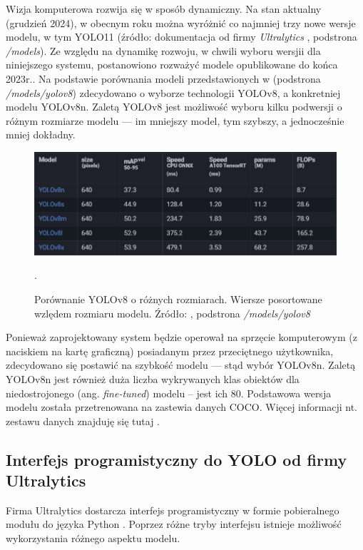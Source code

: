 Wizja komputerowa rozwija się w sposób dynamiczny. Na stan aktualny (grudzień 2024), w obecnym roku można wyróżnić co najmniej trzy nowe wersje modelu, w tym YOLO11 \cite{yolo11_ultralytics} (źródło: dokumentacja od firmy \emph{Ultralytics} \cite{yolo_docs}, podstrona \emph{/models}).
Ze względu na dynamikę rozwoju, w chwili wyboru wersjii dla niniejszego systemu, postanowiono rozważyć modele opublikowane do końca 2023r.. Na podstawie porównania modeli przedstawionych w \cite{yolo_docs} (podstrona \emph{/models/yolov8}) zdecydowano o wyborze technologii YOLOv8, a konkretniej modelu YOLOv8n. Zaletą YOLOv8 jest możliwość wyboru kilku podwersji o różnym rozmiarze modelu --- im mniejszy model, tym szybszy, a jednocześnie mniej dokładny.

\begin{figure}[H]
    \centering
    \includegraphics[width=\linewidth]{r_technologie/AI_assets/yolo8_sizes.png}
    \caption{Porównanie YOLOv8 o różnych rozmiarach. Wiersze posortowane wzlędem rozmiaru modelu. Źródło: \cite{yolo_docs}, podstrona \emph{/models/yolov8}}.
    \label{fig:yolo8-sizes}
\end{figure}

Ponieważ zaprojektowany system będzie operował na sprzęcie komputerowym (z naciskiem na kartę graficzną) posiadanym przez przeciętnego użytkownika, zdecydowano się postawić na szybkość modelu --- stąd wybór YOLOv8n. 
Zaletą YOLOv8n jest również duża liczba wykrywanych klas obiektów dla niedostrojonego (ang. \emph{fine-tuned}) modelu -- jest ich 80. Podstawowa wersja modelu została przetrenowana na zastewia danych COCO. Więcej informacji nt. zestawu danych znajduję się tutaj \cite{COCO_docs}. 


\subsection{Interfejs programistyczny do YOLO od firmy Ultralytics}
\label{chap:wprowadzenie-yolo_interjes}
Firma Ultralytics dostarcza interfejs programistyczny w formie pobieralnego modułu do języka Python \cite{Python_docs}. Poprzez różne tryby interfejsu istnieje możliwość wykorzystania różnego aspektu modelu. 

